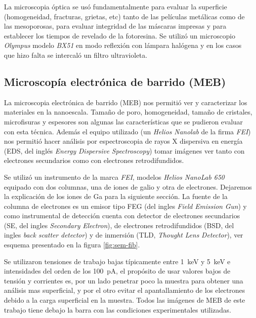 		La microscopia óptica se usó fundamentalmente para evaluar la superficie (homogeneidad, fracturas, grietas, etc) tanto de las películas metálicas como de las mesoporosas, para evaluar integridad de las máscaras impresas y para establecer los tiempos de revelado de la fotoresina. Se utilizó un microscopio \textit{Olympus} modelo \textit{BX51} en modo reflexión con lámpara halógena y en los casos que hizo falta se intercaló un filtro ultravioleta.

	
	\subsection{Microscopía electrónica de barrido (MEB)}\label{sec:SEM}

		La microscopia electrónica de barrido (MEB) nos permitió ver y caracterizar los materiales en la nanoescala. Tamaño de poro, homogeneidad, tamaño de cristales, microfisuras y espesores son algunas las características que se pudieron evaluar con esta técnica. Además el equipo utilizado (un \textit{Helios Nanolab} de la firma \textit{FEI}) nos permitió hacer análisis por espectroscopia de rayos X dispersiva en energía (EDS, del inglés \textit{Energy Dispersive Spectroscopy}) tomar imágenes ver tanto con electrones secundarios como con electrones retrodifundidos. \cite{Goodhew2000,Watt1997}

		Se utilizó un instrumento de la marca \textit{FEI}, modelos \textit{Helios NanoLab 650} equipado con dos columnas, una de iones de galio y otra de electrones. Dejaremos la explicación de los iones de Ga para la siguiente sección. La fuente de la columna de electrones es un emisor tipo FEG (del ingles \textit{Field Emission Gun}) y como instrumental de detección cuenta con detector de electrones secundarios (SE, del ingles \textit{Secondary Electron}), de electrones retrodifundidos (BSD, del ingles \textit{back scatter detector}) y de inmersión (TLD, \textit{Thought Lens Detector}), ver esquema presentado en la figura \ref{fig:sem-fib}. 

		Se utilizaron tensiones de trabajo bajas típicamente entre \SI{1}{\kilo\electronvolt} y \SI{5}{\kilo\electronvolt} e intensidades del orden de los \SI{100}{\pA}, el propósito de usar valores bajos de tensión y corrientes es, por un lado penetrar poco la muestra para obtener una análisis mas superficial, y por el otro evitar el apantallamiento de los electrones debido a la carga superficial en la muestra. Todos las imágenes de MEB de este trabajo tiene debajo la barra con las condiciones experimentales utilizadas.


